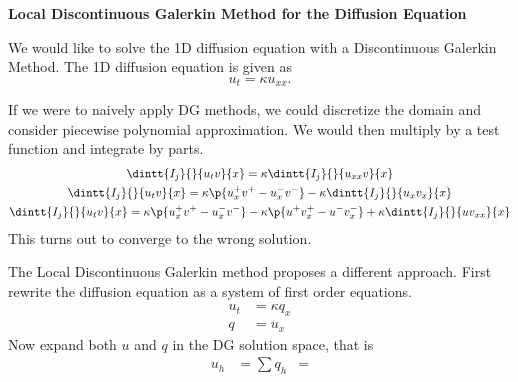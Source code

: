\documentclass[11pt, oneside]{article}
\begin{document}
\begin{center}
\textbf{\Large{Local Discontinuous Galerkin Method for the Diffusion
Equation
}}
\end{center}

We would like to solve the 1D diffusion equation with a Discontinuous Galerkin
Method.
The 1D diffusion equation is given as
\[
  u_t = \kappa u_{xx}.
\]

If we were to naively apply DG methods, we could discretize the domain and
consider piecewise polynomial approximation.
We would then multiply by a test function and integrate by parts.
\begin{gather*}
  \dintt{I_j}{}{u_t v}{x} = \kappa \dintt{I_j}{}{u_{xx} v}{x} \\
  \dintt{I_j}{}{u_t v}{x} = \kappa \p{u^+_x v^+ - u^-_x v^-} - \kappa \dintt{I_j}{}{u_x v_x}{x} \\
  \dintt{I_j}{}{u_t v}{x} = \kappa \p{u^+_x v^+ - u^-_x v^-} - \kappa \p{u^+ v^+_x - u^- v^-_x}
    + \kappa \dintt{I_j}{}{u v_{xx}}{x}
\end{gather*}
This turns out to converge to the wrong solution.

The Local Discontinuous Galerkin method proposes a different approach.
First rewrite the diffusion equation as a system of first order equations.
\begin{align*}
  u_t &= \kappa q_x \\
  q &= u_x
\end{align*}
Now expand both $u$ and $q$ in the DG solution space, that is
\begin{align*}
  u_h &= \sum
  q_h &= 
\end{align*}
\end{document}
